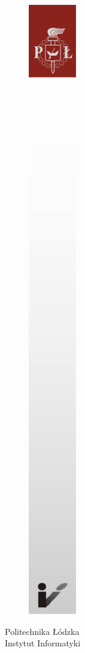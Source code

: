 \documentclass[12pt]{report}
\begin{document}
\begin{titlepage}
	\begin{figure}
		\includegraphics[height=267mm]{left_strip.png}
	\end{figure}

	\noindent
	Politechnika Łódzka\\
	\textcolor{defaultRed}{Instytut Informatyki}
\end{titlepage}
\end{document}
